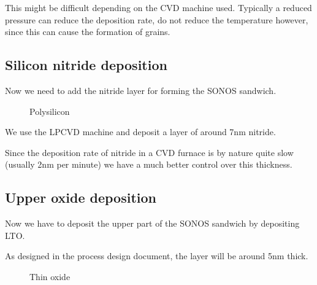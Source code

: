 This might be difficult depending on the CVD machine used. Typically a reduced pressure can reduce the deposition rate, do not reduce the temperature however, since this can cause the formation of grains.

\subsection{Silicon nitride deposition}\label{step_depositing_sonos_nitride}

Now we need to add the nitride layer for forming the SONOS sandwich.

\begin{figure}[H]
	\centering
	\begin{tikzpicture}[node distance = 3cm, auto, thick,scale=\CrossSectionOnly, every node/.style={transform shape}]
		
	\end{tikzpicture}
	\drawStepArrow{}
	\begin{tikzpicture}[node distance = 3cm, auto, thick,scale=\CrossSectionOnly, every node/.style={transform shape}]
		
	\end{tikzpicture}
	\caption{Polysilicon}
\end{figure}

We use the LPCVD machine and deposit a layer of around 7nm nitride.

Since the deposition rate of nitride in a CVD furnace is by nature quite slow (usually 2nm per minute) we have a much better control over this thickness.

\newpage

\subsection{Upper oxide deposition}\label{step_growing_gate_oxide}

Now we have to deposit the upper part of the SONOS sandwich by depositing LTO.

As designed in the process design document, the layer will be around 5nm thick.

\begin{figure}[H]
	\centering
	\begin{tikzpicture}[node distance = 3cm, auto, thick,scale=\CrossSectionOnly, every node/.style={transform shape}]
		
	\end{tikzpicture}
	\begin{tikzpicture}[node distance = 3cm, auto, thick,scale=\CrossSectionOnly, every node/.style={transform shape}]
		
	\end{tikzpicture}
	\caption{Thin oxide}
\end{figure}

